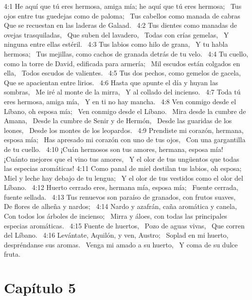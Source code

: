 4:1 He aquí que tú eres hermosa, amiga mía; he aquí que tú eres hermosa;  
Tus ojos entre tus guedejas como de paloma;  
Tus cabellos como manada de cabras  
Que se recuestan en las laderas de Galaad.  
4:2 Tus dientes como manadas de ovejas trasquiladas,  
Que suben del lavadero,  
Todas con crías gemelas,  
Y ninguna entre ellas estéril.  
4:3 Tus labios como hilo de grana,  
Y tu habla hermosa;  
Tus mejillas, como cachos de granada detrás de tu velo.  
4:4 Tu cuello, como la torre de David, edificada para armería;  
Mil escudos están colgados en ella,  
Todos escudos de valientes.  
4:5 Tus dos pechos, como gemelos de gacela,  
Que se apacientan entre lirios.  
4:6 Hasta que apunte el día y huyan las sombras,  
Me iré al monte de la mirra,  
Y al collado del incienso.  
4:7 Toda tú eres hermosa, amiga mía,  
Y en ti no hay mancha.  
4:8 Ven conmigo desde el Líbano, oh esposa mía;  
Ven conmigo desde el Líbano.  
Mira desde la cumbre de Amana,  
Desde la cumbre de Senir y de Hermón,  
Desde las guaridas de los leones,  
Desde los montes de los leopardos.  
4:9 Prendiste mi corazón, hermana, esposa mía;  
Has apresado mi corazón con uno de tus ojos,  
Con una gargantilla de tu cuello.  
4:10 ¡Cuán hermosos son tus amores, hermana, esposa mía!  
¡Cuánto mejores que el vino tus amores,  
Y el olor de tus ungüentos que todas las especias aromáticas! 
4:11 Como panal de miel destilan tus labios, oh esposa;  
Miel y leche hay debajo de tu lengua;  
Y el olor de tus vestidos como el olor del Líbano.  
4:12 Huerto cerrado eres, hermana mía, esposa mía;  
Fuente cerrada, fuente sellada.  
4:13 Tus renuevos son paraíso de granados, con frutos suaves,  
De flores de alheña y nardos;  
4:14 Nardo y azafrán, caña aromática y canela,  
Con todos los árboles de incienso;  
Mirra y áloes, con todas las principales especias aromáticas.  
4:15 Fuente de huertos,  
Pozo de aguas vivas,  
Que corren del Líbano.  
4:16 Levántate, Aquilón, y ven, Austro;  
Soplad en mi huerto, despréndanse sus aromas.  
Venga mi amado a su huerto,  
Y coma de su dulce fruta.  
\section*{Capítulo 5 }

